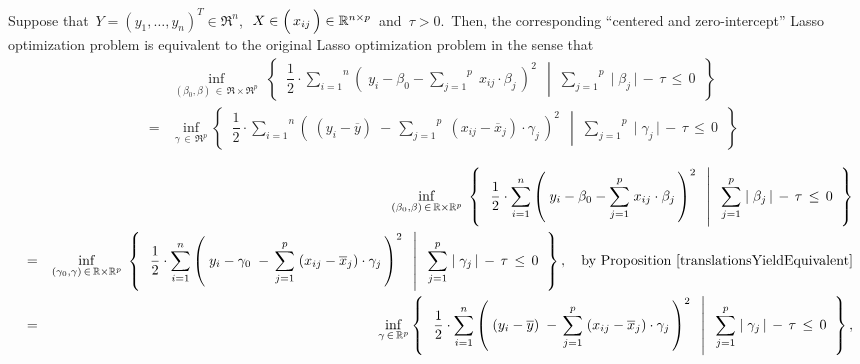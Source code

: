 \vskip 0.5cm
\begin{theorem}
\mbox{}
\vskip 0.0cm
\noindent
Suppose that
\,$Y = (y_{1},\ldots,y_{n})^{T} \in \Re^{n}$,\,
\,$X \in \left(\,\overset{{\color{white}-}}{x_{ij}}\,\right)\in\Re^{n \times p}$\, and
\,$\tau > 0$.\,
Then, the corresponding ``centered and zero-intercept'' Lasso optimization problem is equivalent to
the original Lasso optimization problem in the sense that
\begin{eqnarray*}
&&
	\underset{(\beta_{0},\beta)\,\in\,\Re\times\Re^{p}}{\inf}\;
	\left\{\;\;
		\left.
		\dfrac{1}{2}
		\cdot
		\overset{n}{\underset{i=1}{\sum}}
		\left(\; y_{i} - \beta_{0} - \overset{p}{\underset{j=1}{\sum}}\; x_{ij}\cdot\beta_{j}\,\right)^{2}
		\;\;\,\right\vert\;\;
		\overset{p}{\underset{j=1}{\sum}}\;
		\vert\;\beta_{j}\,\vert
		\, - \,
		\tau \, \leq \, 0
		\;\;\right\}
\\
& = &
	\underset{\gamma\,\in\,\Re^{p}}{\inf}
	\left\{\;\;
		\left.
		\dfrac{1}{2}
		\cdot
		\overset{n}{\underset{i=1}{\sum}}
		\left(\; (y_{i} - \overline{y}) \;-\, \overset{p}{\underset{j=1}{\sum}}\; (x_{ij}-\overline{x}_{j})\cdot\gamma_{j}\,\right)^{2}
		\;\;\,\right\vert\;\;
		\overset{p}{\underset{j=1}{\sum}}\;
		\vert\;\gamma_{j}\,\vert
		\, - \,
		\tau \, \leq \, 0
		\;\;\right\}
\end{eqnarray*}
\end{theorem}
\proof
\begin{eqnarray*}
&&
	\underset{(\beta_{0},\beta)\,\in\,\Re\times\Re^{p}}{\inf}\;
	\left\{\;\;
		\left.
		\dfrac{1}{2}
		\cdot
		\overset{n}{\underset{i=1}{\sum}}
		\left(\; y_{i} - \beta_{0} - \overset{p}{\underset{j=1}{\sum}}\; x_{ij}\cdot\beta_{j}\,\right)^{2}
		\;\;\,\right\vert\;\;
		\overset{p}{\underset{j=1}{\sum}}\;
		\vert\;\beta_{j}\,\vert
		\, - \,
		\tau \, \leq \, 0
		\;\;\right\}
\\
& = &
	\underset{(\gamma_{0},\gamma)\,\in\,\Re\times\Re^{p}}{\inf}\;
	\left\{\;\;
		\left.
		\dfrac{1}{2}
		\cdot
		\overset{n}{\underset{i=1}{\sum}}
		\left(\; y_{i} - \gamma_{0} \;-\, \overset{p}{\underset{j=1}{\sum}}\; (x_{ij}-\overline{x}_{j})\cdot\gamma_{j}\,\right)^{2}
		\;\;\,\right\vert\;\;
		\overset{p}{\underset{j=1}{\sum}}\;
		\vert\;\gamma_{j}\,\vert
		\, - \,
		\tau \, \leq \, 0
		\;\;\right\},
	\quad
	\textnormal{by Proposition \ref{translationsYieldEquivalent}}
\\
& = &
	\underset{\gamma\,\in\,\Re^{p}}{\inf}
	\left\{\;\;
		\left.
		\dfrac{1}{2}
		\cdot
		\overset{n}{\underset{i=1}{\sum}}
		\left(\; (y_{i} - \overline{y}) \;-\, \overset{p}{\underset{j=1}{\sum}}\; (x_{ij}-\overline{x}_{j})\cdot\gamma_{j}\,\right)^{2}
		\;\;\,\right\vert\;\;
		\overset{p}{\underset{j=1}{\sum}}\;
		\vert\;\gamma_{j}\,\vert
		\, - \,
		\tau \, \leq \, 0
		\;\;\right\},
\end{eqnarray*}
